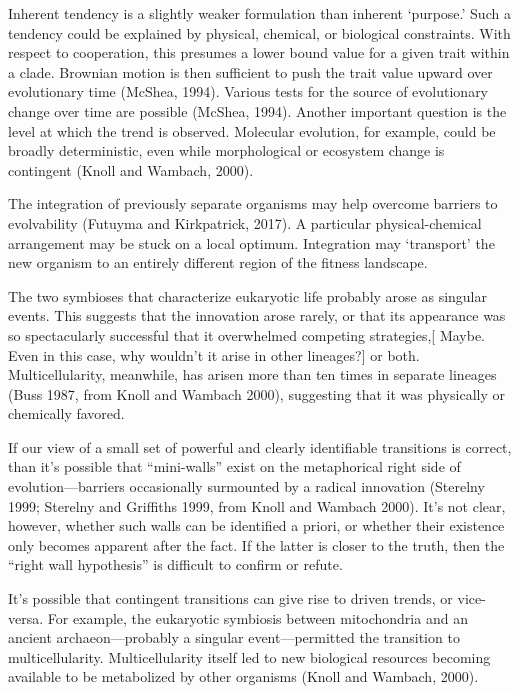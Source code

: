 \documentclass{tufte-book} %
\begin{document}
Inherent tendency is a slightly weaker formulation than inherent ‘purpose.’ Such a tendency could be explained by physical, chemical, or biological constraints.  With respect to cooperation, this presumes a lower bound value for a given trait within a clade. Brownian motion is then sufficient to push the trait value upward over evolutionary time (McShea, 1994). 
Various tests for the source of evolutionary change over time are possible (McShea, 1994).
Another important question is the level at which the trend is observed. Molecular evolution, for example, could be broadly deterministic, even while morphological or ecosystem change is contingent (Knoll and Wambach, 2000).

The integration of previously separate organisms may help overcome barriers to evolvability (Futuyma and Kirkpatrick, 2017). A particular physical-chemical arrangement may be stuck on a local optimum. Integration may ‘transport’ the new organism to an entirely different region of the fitness landscape.

The two symbioses that characterize eukaryotic life probably arose as singular events. This suggests that the innovation arose rarely, or that its appearance was so spectacularly successful that it overwhelmed competing strategies,[ Maybe. Even in this case, why wouldn’t it arise in other lineages?] or both.  Multicellularity, meanwhile, has arisen more than ten times in separate lineages (Buss 1987, from Knoll and Wambach 2000), suggesting that it was physically or chemically favored. 

If our view of a small set of powerful and clearly identifiable transitions is correct, than it’s possible that “mini-walls” exist on the metaphorical right side of evolution—barriers occasionally surmounted by a radical innovation (Sterelny 1999; Sterelny and Griffiths 1999, from Knoll and Wambach 2000). It’s not clear, however, whether such walls can be identified a priori, or whether their existence only becomes apparent after the fact. If the latter is closer to the truth, then the “right wall hypothesis” is difficult to confirm or refute.

It’s possible that contingent transitions can give rise to driven trends, or vice-versa. For example, the eukaryotic symbiosis between mitochondria and an ancient archaeon—probably a singular event—permitted the transition to multicellularity. Multicellularity itself led to new biological resources becoming available to be metabolized by other organisms (Knoll and Wambach, 2000). 
\end{document}
